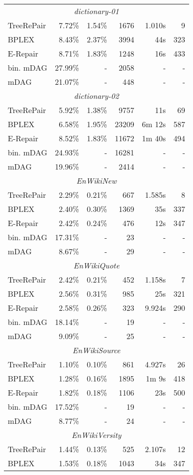 \documentclass[12pt]{llncs}
\begin{document}
\begin{longtable}{lrrrrr}
			\midrule\multicolumn{6}{c}{\emph{dictionary-01}}\\*
			TreeRePair&7.72\%&1.54\%&1676&1.010s&9\\*
			BPLEX&8.43\%&2.37\%&3994&44s&323\\*
			E-Repair&8.71\%&1.83\%&1248&16s&433\\*
			bin. mDAG&27.99\%&-&2058&-&-\\*
			mDAG&21.07\%&-&448&-&-\\
			\midrule\multicolumn{6}{c}{\emph{dictionary-02}}\\*
			TreeRePair&5.92\%&1.38\%&9757&11s&69\\*
			BPLEX&6.58\%&1.95\%&23209&6m 12s&587\\*
			E-Repair&8.52\%&1.83\%&11672&1m 40s&494\\*
			bin. mDAG&24.93\%&-&16281&-&-\\*
			mDAG&19.96\%&-&2414&-&-\\
			\midrule\multicolumn{6}{c}{\emph{EnWikiNew}}\\*
			TreeRePair&2.29\%&0.21\%&667&1.585s&8\\*
			BPLEX&2.40\%&0.30\%&1369&35s&337\\*
			E-Repair&2.42\%&0.24\%&476&12s&347\\*
			bin. mDAG&17.31\%&-&23&-&-\\*
			mDAG&8.67\%&-&29&-&-\\
			\midrule\multicolumn{6}{c}{\emph{EnWikiQuote}}\\*
			TreeRePair&2.42\%&0.21\%&452&1.158s&7\\*
			BPLEX&2.56\%&0.31\%&985&25s&321\\*
			E-Repair&2.58\%&0.26\%&323&9.924s&290\\*
			bin. mDAG&18.14\%&-&19&-&-\\*
			mDAG&9.09\%&-&25&-&-\\
			\midrule\multicolumn{6}{c}{\emph{EnWikiSource}}\\*
			TreeRePair&1.10\%&0.10\%&861&4.927s&26\\*
			BPLEX&1.28\%&0.16\%&1895&1m 9s&418\\*
			E-Repair&1.82\%&0.18\%&1106&23s&500\\*
			bin. mDAG&17.52\%&-&19&-&-\\*
			mDAG&8.77\%&-&24&-&-\\
			\midrule\multicolumn{6}{c}{\emph{EnWikiVersity}}\\*
			TreeRePair&1.44\%&0.13\%&525&2.107s&12\\*
			BPLEX&1.53\%&0.18\%&1043&34s&347\\*

\end{longtable}
\end{document}
